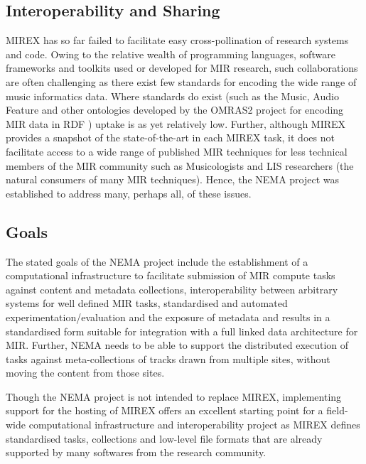 \documentclass[conference]{IEEEtran}
\begin{document}
\subsection{Interoperability and Sharing}
MIREX has so far failed to facilitate easy cross-pollination of research systems and code. Owing to the relative wealth of programming languages, software frameworks and toolkits used or developed for MIR research, such collaborations are often challenging as there exist few standards for encoding the wide range of music informatics data. Where standards do exist (such as the Music, Audio Feature and other ontologies developed by the OMRAS2 project for encoding MIR data in RDF \cite{raimond2007music}) uptake is as yet relatively low.  
Further, although MIREX provides a snapshot of the state-of-the-art in each MIREX task, it does not facilitate access to a wide range of published MIR techniques for less technical members of the MIR community such as Musicologists and LIS researchers (the natural consumers of many MIR techniques). Hence, the NEMA project was established to address many, perhaps all, of these issues.

\subsection{Goals}
The stated goals of the NEMA project include the establishment of a computational infrastructure to facilitate submission of MIR compute tasks against content and metadata collections, interoperability between arbitrary systems for well defined MIR tasks, standardised and automated experimentation/evaluation and the exposure of metadata and results in a standardised form suitable for integration with a full linked data architecture for MIR. Further, NEMA needs to be able to support the distributed execution of tasks against meta-collections of tracks drawn from multiple sites, without moving the content from those sites.

Though the NEMA project is not intended to replace MIREX, implementing support for the hosting of MIREX offers an excellent starting point for a field-wide computational infrastructure and interoperability project as MIREX defines standardised tasks, collections and low-level file formats that are already supported by many softwares from the research community. 
\end{document}
